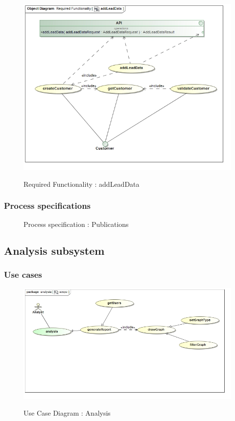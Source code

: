 \documentclass{article}
\begin{document}
		\begin{figure}[H]
		\includegraphics[width=\textwidth]{images/obj__Required_Functionality__addLeadData.jpg}  \\
		\caption{Required Functionality : addLeadData}
		\end{figure}

		\subsubsection{Process specifications}

		\begin{figure}[H]
		\caption{Process specification : Publications}
		\end{figure}

	\subsection{Analysis subsystem}
		\subsubsection{Use cases}

		\begin{figure}[H]
		\includegraphics[width=\textwidth]{images/uc__analysis__scope.jpg}  \\
		\caption{Use Case Diagram : Analysis}
		\end{figure}
\end{document}
